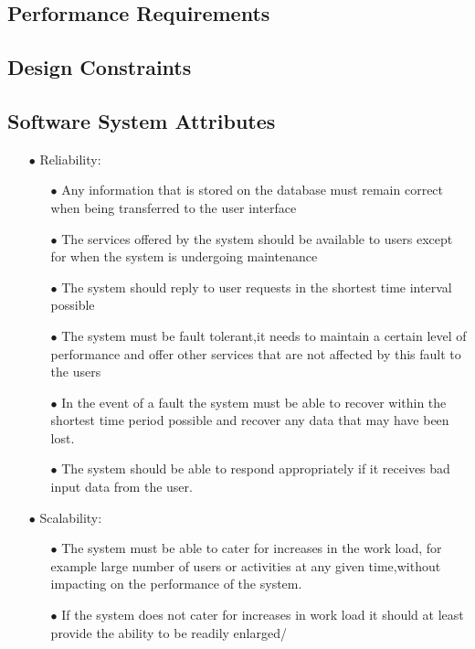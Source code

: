 \documentclass[a4paper,12pt]{article}
\begin{document}
\subsection{Performance Requirements}
\subsection{Design Constraints}
\subsection{Software System Attributes}
\begin{itemize}
\item[$\bullet$]Reliability:
	\begin{itemize}
		\item[$\bullet$] Any information that is stored on the database must remain correct 
		when being transferred to the user interface 
		\item[$\bullet$] The services offered by the system should be available to users except 
		for when the system is undergoing maintenance 
		\item[$\bullet$] The system should reply to user requests in the shortest time interval possible 
		\item[$\bullet$] The system must be fault tolerant,it needs to maintain a certain level of 
		performance and offer other services that are not affected by this fault to the users 
		\item[$\bullet$] In the event of a fault the system must be able to recover within the shortest
		time period possible and recover any data that may have been lost.
		\item[$\bullet$] The system should be able to respond appropriately if it receives  bad input data from the 
		user.			 
	\end{itemize}
 
\item[$\bullet$] Scalability:
	\begin{itemize}
		\item[$\bullet$] The system must be able to cater for increases in the work load, 
		for example large number of users or activities at any given time,without impacting on the 
		performance of the system.
		 \item[$\bullet$] If the system does not cater for increases in work load it should at least 
		 provide the ability to be readily enlarged/ 
	\end{itemize}
	

\end{itemize}
\end{document}
